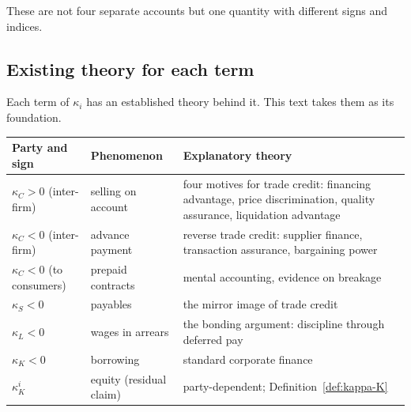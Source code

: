 These are not four separate accounts but one quantity with different signs and indices.

\subsection{Existing theory for each term}
\label{sec:kappa-literature}

Each term of $\kappa_i$ has an established theory behind it. This text takes them as its
foundation.

\begin{center}
\begin{tabularx}{\textwidth}{@{}llX@{}}
\toprule
Party and sign & Phenomenon & Explanatory theory \\
\midrule
$\kappa_C>0$ (inter-firm) & selling on account & four motives for trade credit: financing advantage, price discrimination, quality assurance, liquidation advantage \cite{petersen1997,schwartz1974} \\
$\kappa_C<0$ (inter-firm) & advance payment & reverse trade credit: supplier finance, transaction assurance, bargaining power \cite{mateut2014,daripa2011} \\
$\kappa_C<0$ (to consumers) & prepaid contracts & mental accounting, evidence on breakage \cite{nber2026pnbl} \\
$\kappa_S<0$ & payables & the mirror image of trade credit \\
$\kappa_L<0$ & wages in arrears & the bonding argument: discipline through deferred pay \cite{akerlof1986} \\
$\kappa_K<0$ & borrowing & standard corporate finance \\
$\kappa_K^{i}$ & equity (residual claim) & party-dependent; Definition~\ref{def:kappa-K} \\
\bottomrule
\end{tabularx}
\label{tab:kappa-literature}
\end{center}

